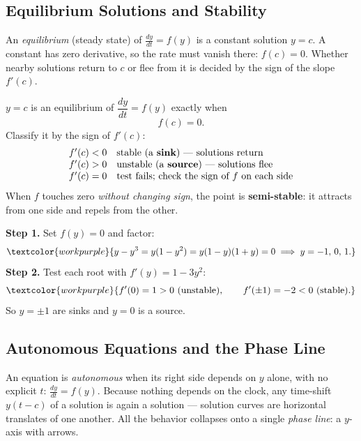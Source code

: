 \subsection{Equilibrium Solutions and Stability}

An \emph{equilibrium} (steady state) of $\frac{dy}{dt} = f(y)$ is a constant
solution $y = c$. A constant has zero derivative, so the rate must vanish there:
$f(c) = 0$. Whether nearby solutions return to $c$ or flee from it is decided by
the sign of the slope $f'(c)$.

\begin{formulabox}
$y = c$ is an equilibrium of $\dfrac{dy}{dt}=f(y)$ exactly when
\[ f(c) = 0. \]
Classify it by the sign of $f'(c)$:
\[
\begin{array}{ll}
f'(c) < 0 & \text{stable (a \textbf{sink}) --- solutions return}\\
f'(c) > 0 & \text{unstable (a \textbf{source}) --- solutions flee}\\
f'(c) = 0 & \text{test fails; check the sign of } f \text{ on each side}
\end{array}
\]
When $f$ touches zero \emph{without changing sign}, the point is
\textbf{semi-stable}: it attracts from one side and repels from the other.
\end{formulabox}

\begin{examplebox}[Worked Example 4.1: Classify the equilibria of $\frac{dy}{dt}=y-y^{3}$]
\textbf{Step 1.} Set $f(y)=0$ and factor:
\[ \textcolor{workpurple}{y - y^{3} = y(1-y^{2}) = y(1-y)(1+y) = 0 \;\Longrightarrow\; y = -1,\,0,\,1.} \]
\textbf{Step 2.} Test each root with $f'(y) = 1 - 3y^{2}$:
\[ \textcolor{workpurple}{f'(0) = 1 > 0\ (\text{unstable}), \qquad f'(\pm 1) = -2 < 0\ (\text{stable}).} \]
So $y=\pm 1$ are sinks and $y=0$ is a source.
\end{examplebox}

\subsection{Autonomous Equations and the Phase Line}

An equation is \emph{autonomous} when its right side depends on $y$ alone, with
no explicit $t$: $\frac{dy}{dt} = f(y)$. Because nothing depends on the clock,
any time-shift $y(t-c)$ of a solution is again a solution --- solution curves are
horizontal translates of one another. All the behavior collapses onto a single
\emph{phase line}: a $y$-axis with arrows.


